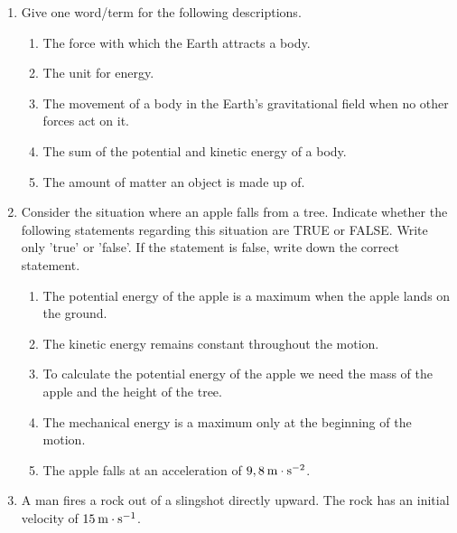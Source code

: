       
      \label{m38786*id71520}\begin{enumerate}[noitemsep, label=\textbf{\arabic*}. ] 
            \label{m38786*uid118}\item Give one word/term for the following descriptions.
\label{m38786*id71536}\begin{enumerate}[noitemsep, label=\textbf{\alph*}. ] 
            \label{m38786*uid119}\item The force with which the Earth attracts a body.
\label{m38786*uid120}\item The unit for energy.
\label{m38786*uid121}\item The movement of a body in the Earth's gravitational field when no other forces act on it.
\label{m38786*uid122}\item The sum of the potential and kinetic energy of a body.
\label{m38786*uid123}\item The amount of matter an object is made up of.
\end{enumerate}
                \label{m38786*uid124}\item Consider the situation where an apple falls from a tree. Indicate whether the following statements regarding this situation are TRUE or FALSE. Write only 'true' or 'false'. If the statement is false, write down the correct statement.
\label{m38786*id71616}\begin{enumerate}[noitemsep, label=\textbf{\alph*}. ] 
            \label{m38786*uid125}\item The potential energy of the apple is a maximum when the apple lands on the ground.
\label{m38786*uid126}\item The kinetic energy remains constant throughout the motion.
\label{m38786*uid127}\item To calculate the potential energy of the apple we need the mass of the apple and the height of the tree.
\label{m38786*uid128}\item The mechanical energy is a maximum only at the beginning of the motion.
\label{m38786*uid129}\item The apple falls at an acceleration of \begin{math}9,8\phantom{\rule{2pt}{0ex}}\mathrm{m}\ensuremath{\cdot}\mathrm{s}{}^{-2}\end{math}.
\end{enumerate}
                \label{m38786*uid131}\item A man fires a rock out of a slingshot directly upward. The rock has an initial velocity of \begin{math}15\phantom{\rule{2pt}{0ex}}\mathrm{m}\ensuremath{\cdot}\mathrm{s}{}^{-1}\end{math}.

\end{enumerate}
